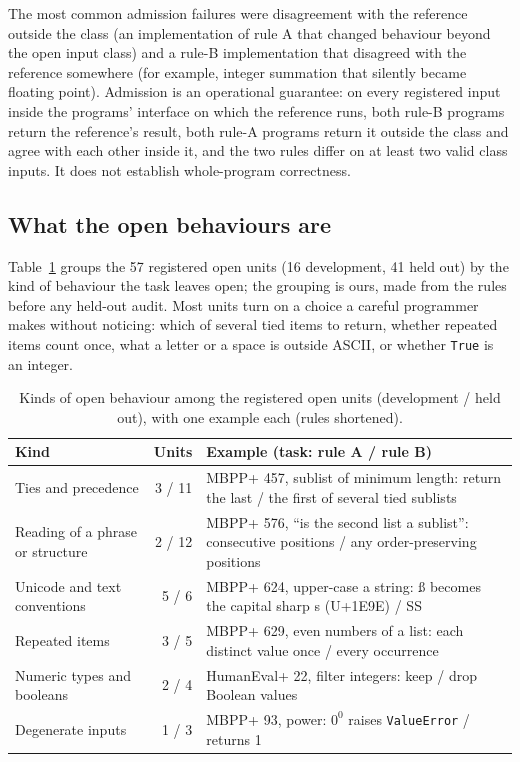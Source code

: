 The most common admission failures were disagreement with the reference outside the class (an implementation of
rule A that changed behaviour beyond the open input class) and a rule-B implementation that disagreed with the
reference somewhere (for example, integer summation that silently became floating point). Admission is an operational
guarantee: on every registered input inside the programs' interface on which the reference runs, both rule-B programs
return the reference's result, both rule-A programs return it outside the class and agree with each other inside it,
and the two rules differ on at least two valid class inputs. It does not establish whole-program correctness.

\subsection{What the open behaviours are}

Table~\ref{tab:e6-kinds} groups the 57 registered open units (16 development, 41 held out) by the kind of behaviour
the task leaves open; the grouping is ours, made from the rules before any held-out audit. Most units turn on a
choice a careful programmer makes without noticing: which of several tied items to return, whether repeated items
count once, what a letter or a space is outside ASCII, or whether \texttt{True} is an integer.

\begin{table}[h]
\centering
\small
\caption{Kinds of open behaviour among the registered open units (development / held out), with one example each
(rules shortened).}
\label{tab:e6-kinds}
\begin{tabular}{p{3.3cm}rp{9.6cm}}
\toprule
Kind & Units & Example (task: rule A / rule B) \\
\midrule
Ties and precedence & 3 / 11 & MBPP+ 457, sublist of minimum length: return the last / the first of several tied sublists \\
Reading of a phrase or structure & 2 / 12 & MBPP+ 576, ``is the second list a sublist'': consecutive positions / any order-preserving positions \\
Unicode and text conventions & 5 / 6 & MBPP+ 624, upper-case a string: \ss{} becomes the capital sharp s (U+1E9E) / SS \\
Repeated items & 3 / 5 & MBPP+ 629, even numbers of a list: each distinct value once / every occurrence \\
Numeric types and booleans & 2 / 4 & HumanEval+ 22, filter integers: keep / drop Boolean values \\
Degenerate inputs & 1 / 3 & MBPP+ 93, power: $0^0$ raises \texttt{ValueError} / returns 1 \\
\bottomrule
\end{tabular}
\end{table}

